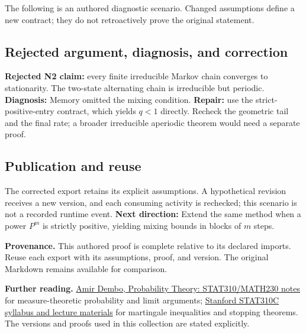 \documentclass[preprint,12pt,aps,pra,showkeys,amsmath,amssymb,superscriptaddress,floatfix]{revtex4-2}
\theoremstyle{definition}
\theoremstyle{remark}
\begin{document}
The following is an authored diagnostic scenario. Changed assumptions
define a new contract; they do not retroactively prove the original
statement.

\subsection{Rejected argument, diagnosis, and correction}
\textbf{Rejected N2 claim:} every finite irreducible Markov chain
converges to stationarity. The two-state alternating chain is
irreducible but periodic. \textbf{Diagnosis:} Memory omitted the mixing
condition. \textbf{Repair:} use the strict-positive-entry contract,
which yields \(q<1\) directly. Recheck the geometric tail and the final
rate; a broader irreducible aperiodic theorem would need a separate
proof.

\subsection{Publication and reuse}
The corrected export retains its explicit assumptions. A hypothetical
revision receives a new version, and each consuming activity is
rechecked; this scenario is not a recorded runtime event. \textbf{Next
direction:} Extend the same method when a power \(P^m\) is strictly
positive, yielding mixing bounds in blocks of \(m\) steps.

\par\medskip\begingroup\small\linespread{1.0}\selectfont\noindent\textbf{Provenance.} This authored proof is complete relative to its declared imports. Reuse
each export with its assumptions, proof, and version. The original
Markdown remains available for comparison.
\par\endgroup

\par\smallskip\begingroup\small\linespread{1.0}\selectfont\noindent\textbf{Further reading.} \href{https://stanford.edu/~montanar/TEACHING/Stat310A/lnotes.pdf}{Amir
Dembo, Probability Theory: STAT310/MATH230 notes} for measure-theoretic
probability and limit arguments;
\href{https://web.stanford.edu/class/stats310c/syllabus.html}{Stanford
STAT310C syllabus and lecture materials} for martingale inequalities and
stopping theorems. The versions and proofs used in this collection are
stated explicitly.\par\endgroup
\end{document}
